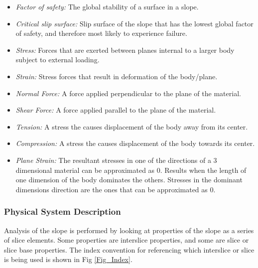 \documentclass[12pt]{article}
\newcommand{\fref}[1]{Fig \ref{#1}}
\begin{document}
\begin{itemize}
\item {\textit{Factor of safety:} The global stability of a surface in a slope.}
  
\item {\textit{Critical slip surface:} Slip surface of the slope that
  has the lowest global factor of safety, and therefore most likely to
  experience failure.}

\item {\textit{Stress:} Forces that are exerted between planes
  internal to a larger body subject to external loading.}
  
\item {\textit{Strain:} Stress forces that result in deformation of
  the body/plane.}
  
\item {\textit{Normal Force:} A force applied perpendicular to the
  plane of the material.}
  
\item {\textit{Shear Force:} A force applied parallel to the plane of
  the material.}
  
\item {\textit{Tension:} A stress the causes displacement of the body
  away from its center.}
  
\item {\textit{Compression:} A stress the causes displacement of the
  body towards its center.}
  
\item {\textit{Plane Strain:} The resultant stresses in one of the
  directions of a 3 dimensional material can be approximated as
  0. Results when the length of one dimension of the body dominates
  the others. Stresses in the dominant dimensions direction are the
  ones that can be approximated as 0.}
  
\end{itemize}

\subsubsection{Physical System Description} \label{sec_system}

Analysis of the slope is performed by looking at properties of the
slope as a series of slice elements. Some properties are interslice
properties, and some are slice or slice base properties.  The index
convention for referencing which interslice or slice is being used is
shown in \fref{Fig_Index}.
\end{document}
